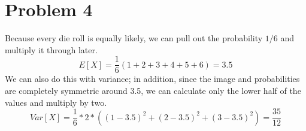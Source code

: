 \documentclass[11pt]{article}
\begin{document}
\section*{Problem 4}
Because every die roll is equally likely, we can pull out the probability $1/6$ and multiply it through later.
	\[E[X] = \dfrac{1}{6}( 1+2+3+4+5+6) = 3.5 \]
We can also do this with variance; in addition, since the image and probabilities are completely symmetric around 3.5, we can calculate only the lower half of the values and multiply by two.
	\[Var[X] = \dfrac{1}{6} * 2 * ( (1-3.5)^2 + (2 - 3.5)^2 + (3-3.5)^2 ) = \dfrac{35}{12} \]
	
\end{document}
